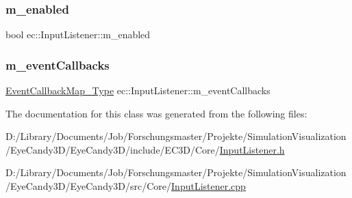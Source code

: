 \subsubsection{\texorpdfstring{m\+\_\+enabled}{m\_enabled}}
{\footnotesize\ttfamily bool ec\+::\+Input\+Listener\+::m\+\_\+enabled\hspace{0.3cm}{\ttfamily [protected]}}

\mbox{\label{classec_1_1_input_listener_a25d3ab10346fa26de7737ded4f1b7318}} 
\subsubsection{\texorpdfstring{m\+\_\+event\+Callbacks}{m\_eventCallbacks}}
{\footnotesize\ttfamily \mbox{\hyperlink{classec_1_1_input_listener_a74ebbc0d4a31fcda8b6cda624e5ecdd1}{Event\+Callback\+Map\+\_\+\+Type}} ec\+::\+Input\+Listener\+::m\+\_\+event\+Callbacks\hspace{0.3cm}{\ttfamily [protected]}}



The documentation for this class was generated from the following files\+:\begin{DoxyCompactItemize}
\item 
D\+:/\+Library/\+Documents/\+Job/\+Forschungsmaster/\+Projekte/\+Simulation\+Visualization/\+Eye\+Candy3\+D/\+Eye\+Candy3\+D/include/\+E\+C3\+D/\+Core/\mbox{\hyperlink{_input_listener_8h}{Input\+Listener.\+h}}\item 
D\+:/\+Library/\+Documents/\+Job/\+Forschungsmaster/\+Projekte/\+Simulation\+Visualization/\+Eye\+Candy3\+D/\+Eye\+Candy3\+D/src/\+Core/\mbox{\hyperlink{_input_listener_8cpp}{Input\+Listener.\+cpp}}\end{DoxyCompactItemize}
